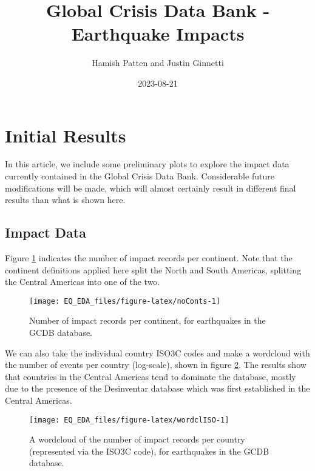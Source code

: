 \documentclass[
]{article}
\title{Global Crisis Data Bank - Earthquake Impacts}
\author{Hamish Patten and Justin Ginnetti}
\date{2023-08-21}
\begin{document}
\maketitle

{
\setcounter{tocdepth}{2}
\tableofcontents
}
\hypertarget{initial-results}{%
\section{Initial Results}\label{initial-results}}

In this article, we include some preliminary plots to explore the impact data currently contained in the Global Crisis Data Bank. Considerable future modifications will be made, which will almost certainly result in different final results than what is shown here.

\hypertarget{impact-data}{%
\subsection{Impact Data}\label{impact-data}}

Figure \ref{fig:noConts} indicates the number of impact records per continent. Note that the continent definitions applied here split the North and South Americas, splitting the Central Americas into one of the two.

\begin{figure}
\texttt{[image: EQ\_EDA\_files/figure-latex/noConts-1]} \caption[Number of impact records per continent, for earthquakes in the GCDB database]{Number of impact records per continent, for earthquakes in the GCDB database.}\label{fig:noConts}
\end{figure}

We can also take the individual country ISO3C codes and make a wordcloud with the number of events per country (log-scale), shown in figure \ref{fig:wordclISO}. The results show that countries in the Central Americas tend to dominate the database, mostly due to the presence of the Desinventar database which was first established in the Central Americas.

\begin{figure}
\texttt{[image: EQ\_EDA\_files/figure-latex/wordclISO-1]} \caption[A wordcloud of the number of impact records per country (represented via the ISO3C code), for earthquakes in the GCDB database]{A wordcloud of the number of impact records per country (represented via the ISO3C code), for earthquakes in the GCDB database.}\label{fig:wordclISO}
\end{figure}
\end{document}
